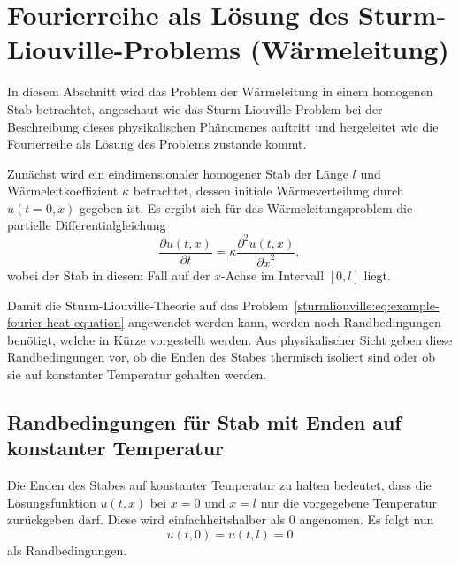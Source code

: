 %
%
%

\section{Fourierreihe als Lösung des Sturm-Liouville-Problems
(Wärmeleitung)}

In diesem Abschnitt wird das Problem der Wärmeleitung in einem homogenen Stab
betrachtet, angeschaut wie das Sturm-Liouville-Problem bei der Beschreibung
dieses physikalischen Phänomenes auftritt und hergeleitet wie die Fourierreihe
als Lösung des Problems zustande kommt.

Zunächst wird ein eindimensionaler homogener Stab der Länge $l$ und
Wärmeleitkoeffizient $\kappa$ betrachtet, dessen initiale Wärmeverteilung durch
$u(t=0, x)$ gegeben ist.
Es ergibt sich für das Wärmeleitungsproblem die partielle Differentialgleichung
\begin{equation}
    \label{sturmliouville:eq:example-fourier-heat-equation}
    \frac{\partial u(t, x)}{\partial t} =
    \kappa \frac{\partial^{2}u(t, x)}{{\partial x}^{2}},
\end{equation}
wobei der Stab in diesem Fall auf der $x$-Achse im Intervall $[0,l]$ liegt.

Damit die Sturm-Liouville-Theorie auf das
Problem~\eqref{sturmliouville:eq:example-fourier-heat-equation} angewendet
werden kann, werden noch Randbedingungen benötigt, welche in Kürze
vorgestellt werden.
Aus physikalischer Sicht geben diese Randbedingungen vor, ob die Enden des
Stabes thermisch isoliert sind oder ob sie auf konstanter Temperatur gehalten
werden.

%
%
\subsection{Randbedingungen für Stab mit Enden auf konstanter Temperatur}

Die Enden des Stabes auf konstanter Temperatur zu halten bedeutet, dass die
Lösungsfunktion $u(t,x)$ bei $x = 0$ und $x = l$ nur die vorgegebene
Temperatur zurückgeben darf. Diese wird einfachheitshalber als $0$ angenomen.
Es folgt nun
\begin{equation}
    \label{sturmliouville:eq:example-fourier-boundary-condition-ends-constant}
    u(t,0)
    =
    u(t,l)
    =
    0
\end{equation}
als Randbedingungen.

